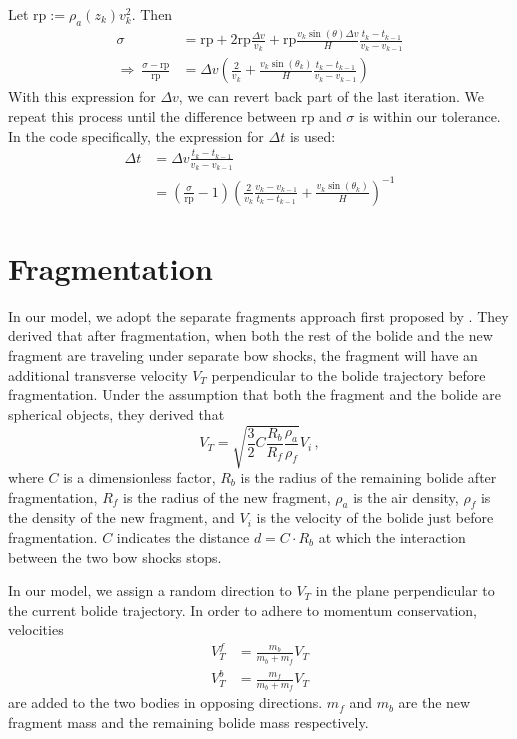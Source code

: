 Let $\mathrm{rp} := \rho_a(z_k)v_k^2$. Then
\begin{align*}
    \sigma &= \mathrm{rp} + 2\mathrm{rp}\frac{\Delta v}{v_k} + \mathrm{rp}\frac{v_k\sin(\theta)\Delta v}{H}\frac{t_k - t_{k-1}}{v_k - v_{k-1}} \\
    \Rightarrow\ \frac{\sigma - \mathrm{rp}}{\mathrm{rp}} &= \Delta v \left(\frac{2}{v_k} + \frac{v_k\sin(\theta_k)}{H}\frac{t_k - t_{k-1}}{v_k - v_{k-1}}\right)
\end{align*}
With this expression for $\Delta v$, we can revert back part of the last iteration. We repeat this process until the difference between $\mathrm{rp}$ and $\sigma$ is within our tolerance. In the code specifically, the expression for $\Delta t$ is used:
\begin{align}
    \Delta t &= \Delta v \frac{t_k - t_{k-1}}{v_k - v_{k-1}} \nonumber \\
    &= \left(\frac{\sigma}{\mathrm{rp}} - 1\right) \left(\frac{2}{v_k}\frac{v_k - v_{k-1}}{t_k - t_{k-1}} + \frac{v_k\sin(\theta_k)}{H}\right)^{-1}
\end{align}

\section{Fragmentation}
\label{sec:frag_detail}
In our model, we adopt the separate fragments approach first proposed by \cite{passey1980effects}.
They derived that after fragmentation, when both the rest of the bolide and the new fragment are traveling under separate bow shocks, 
the fragment will have an additional transverse velocity $V_T$ perpendicular to the bolide trajectory before fragmentation.
Under the assumption that both the fragment and the bolide are spherical objects,
they derived that
\begin{equation}
    V_T = \sqrt{\frac{3}{2}C\frac{R_b}{R_f}\frac{\rho_a}{\rho_f}}V_i\,,
\end{equation}
where $C$ is a dimensionless factor, $R_b$ is the radius of the remaining bolide after fragmentation,
$R_f$ is the radius of the new fragment, $\rho_a$ is the air density, $\rho_f$ is the density of the new fragment,
and $V_i$ is the velocity of the bolide just before fragmentation. $C$ indicates the distance $d = C\cdot R_b$ at which the interaction between the two bow shocks stops.

In our model, we assign a random direction to $V_T$ in the plane perpendicular to the current bolide trajectory.
In order to adhere to momentum conservation, velocities
\begin{align}
    V_T^f &= \frac{m_b}{m_b + m_f}V_T \\
    V_T^b &= \frac{m_f}{m_b + m_f}V_T
\end{align}
are added to the two bodies in opposing directions.
$m_f$ and $m_b$ are the new fragment mass and the remaining bolide mass respectively.

